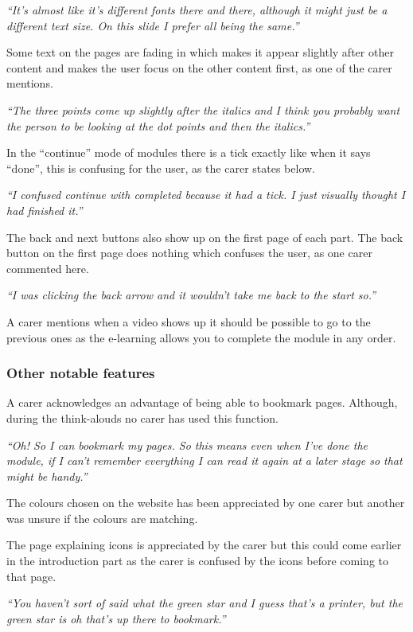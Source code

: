 \documentclass{sigchi}
\begin{document}
\textit{“It’s almost like it’s different fonts there and there, although it might just be a different text size. On this slide I prefer all being the same.”}

Some text on the pages are fading in which makes it appear slightly after other content and makes the user focus on the other content first, as one of the carer mentions.

\textit{“The three points come up slightly after the italics and I think you probably want the person to be looking at the dot points and then the italics.”}

In the “continue” mode of modules there is a tick exactly like when it says “done”, this is confusing for the user, as the carer states below. 

\textit{“I confused continue with completed because it had a tick. I just visually thought I had finished it.”}

The back and next buttons also show up on the first page of each part. The back button on the first page does nothing which confuses the user, as one carer commented here.

\textit{“I was clicking the back arrow and it wouldn't take me back to the start so.”}

A carer mentions when a video shows up it should be possible to go to the previous ones as the e-learning allows you to complete the module in any order.

\subsubsection{Other notable features}
A carer acknowledges an advantage of being able to bookmark pages. Although, during the think-alouds no carer has used this function. 

\textit{“Oh! So I can bookmark my pages. So this means even when I’ve done the module, if I can’t remember everything I can read it again at a later stage so that might be handy.”}

The colours chosen on the website has been appreciated by one carer but another was unsure if the colours are matching. 

The page explaining icons is appreciated by the carer but this could come earlier in the introduction part as the carer is confused by the icons before coming to that page.

\textit{“You haven’t sort of said what the green star and I guess that’s a printer, but the green star is oh that’s up there to bookmark.”}
\end{document}
